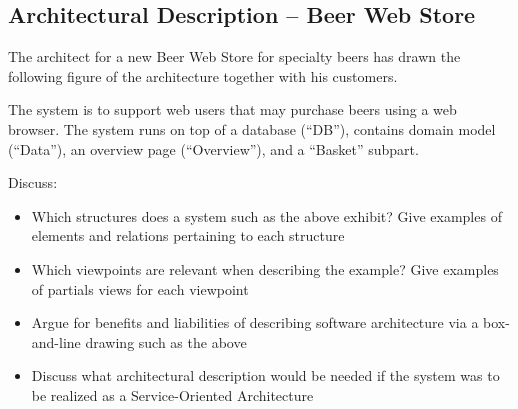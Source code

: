 \subsection{Architectural Description -- Beer Web Store}
The architect for a new Beer Web Store for specialty beers has drawn
the following figure of the architecture together with his customers.
\begin{figure}[h!]
  \centerline{}
\end{figure}
The system is to support web users that may purchase beers using a web
browser. The system runs on top of a database (``DB''), contains
domain model (``Data''), an overview page (``Overview''), and a
``Basket'' subpart.

Discuss:
\begin{itemize}
    \item Which structures does a system such as the above exhibit?
    Give examples of elements and relations pertaining to each
    structure
    \item Which viewpoints are relevant when describing the example?
    Give examples of partials views for each viewpoint
    \item Argue for benefits and liabilities of describing software
    architecture via a box-and-line drawing such as the above
    \item Discuss what architectural description would be needed if
    the system was to be realized as a Service-Oriented Architecture
\end{itemize}
